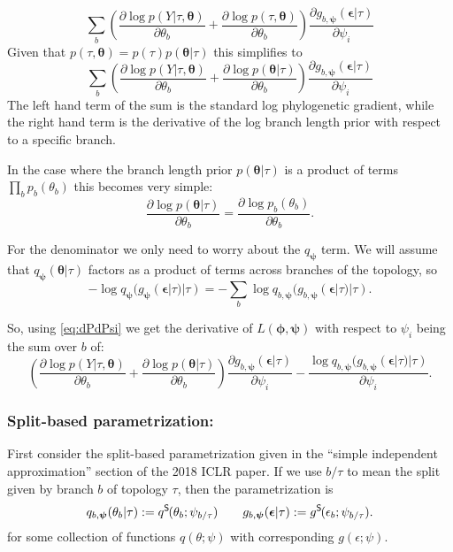 \documentclass{article}
\newcommand{\qSplit}{q^\textsf{S}\hspace{-1pt}}
\newcommand{\gSplit}{g^\textsf{S}\hspace{-1pt}}
\begin{document}
\begin{equation}
    \sum_b
    \left(
        \frac{\partial \log p(Y | \tau, \bm\theta)}{\partial \theta_b}
        +
        \frac{\partial \log p(\tau, \bm\theta)}{\partial \theta_b}
    \right)
    \frac{\partial g_{b,\bm\psi}(\bm\epsilon | \tau)}{\partial \psi_i}
    \label{eq:dLdPsi}
\end{equation}
Given that $p(\tau, \bm\theta) = p(\tau) p(\bm\theta | \tau)$ this simplifies to
\begin{equation}
    \sum_b
    \left(
        \frac{\partial \log p(Y | \tau, \bm\theta)}{\partial \theta_b}
        +
        \frac{\partial \log p(\bm\theta | \tau)}{\partial \theta_b}
    \right)
    \frac{\partial g_{b,\bm\psi}(\bm\epsilon | \tau)}{\partial \psi_i}
    \label{eq:dPdPsi}
\end{equation}
The left hand term of the sum is the standard log phylogenetic gradient, while the right hand term is the derivative of the log branch length prior with respect to a specific branch.

In the case where the branch length prior $p(\bm\theta | \tau)$ is a product of terms $\prod_b p_b(\theta_b)$ this becomes very simple:
\[
    \frac{\partial \log p(\bm\theta | \tau)}{\partial \theta_b} =
    \frac{\partial \log p_b(\theta_b)}{\partial \theta_b}.
\]

For the denominator we only need to worry about the $q_{\bm\psi}$ term.
We will assume that $q_{\bm\psi}(\bm\theta | \tau)$ factors as a product of terms across branches of the topology, so
\[
    - \log q_{\bm{\psi}}(g_{\bm{\psi}}(\bm{\epsilon}|\tau)|\tau) =
    - \sum_b \log q_{b, \bm{\psi}}(g_{b, \bm{\psi}}(\bm{\epsilon}|\tau)|\tau).
\]

So, using \eqref{eq:dPdPsi} we get the derivative of $L(\bm\phi, \bm\psi)$ with respect to $\psi_i$ being the sum over $b$ of:
\begin{equation*}
    \left(
        \frac{\partial \log p(Y | \tau, \bm\theta)}{\partial \theta_b}
        +
        \frac{\partial \log p(\bm\theta | \tau)}{\partial \theta_b}
    \right)
    \frac{\partial g_{b,\bm\psi}(\bm\epsilon | \tau)}{\partial \psi_i}
    - \frac{\log q_{b, \bm\psi}(g_{b, \bm\psi}(\bm\epsilon|\tau)|\tau)}{\partial \psi_i}.
\end{equation*}

\subsubsection*{Split-based parametrization:}
First consider the split-based parametrization given in the ``simple independent approximation'' section of the 2018 ICLR paper.
If we use $b \slash \tau$ to mean the split given by branch $b$ of topology $\tau$, then the parametrization is
\[
q_{b, \bm{\psi}}(\theta_b | \tau) := \qSplit(\theta_b; \psi_{b \slash \tau})
\qquad
g_{b,\bm\psi}(\bm\epsilon | \tau) := \gSplit(\epsilon_b; \psi_{b \slash \tau}).
\]
for some collection of functions $q(\theta; \psi)$ with corresponding $g(\epsilon; \psi)$.
\end{document}
